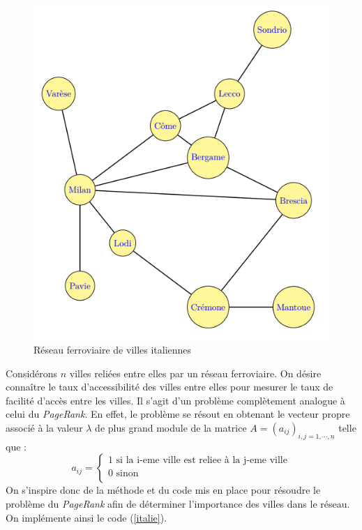 \documentclass[a4paper,10pt]{report}
\begin{document}
\begin{figure}[H]
\centering
\caption{Réseau ferroviaire de villes italiennes}
\includegraphics[width=13cm]{italie.png}
\end{figure}

Considérons $n$ villes reliées entre elles par un réseau ferroviaire. On désire connaître le taux d'accessibilité des villes entre elles pour mesurer le taux de facilité d'accès entre les villes. Il s'agit d'un problème complètement analogue à celui du \textit{PageRank}. En effet, le problème se résout en obtenant le vecteur propre associé à la valeur $\lambda$ de plus grand module de la matrice $A=(a_{ij})_{i,j=1,\cdots , n}$ telle que :\\
\begin{displaymath}
a_{ij}= \left\lbrace
\begin{array}{l}
1 \text{ si la i-eme ville est reliee à la j-eme ville}  \\
0 \text{ sinon} \\
\end{array}\right.
\end{displaymath}
On s'inspire donc de la méthode et du code mis en place pour résoudre le problème du \textit{PageRank} afin de déterminer l'importance des villes dans le réseau. On implémente ainsi le code (\ref{italie}).
\end{document}
